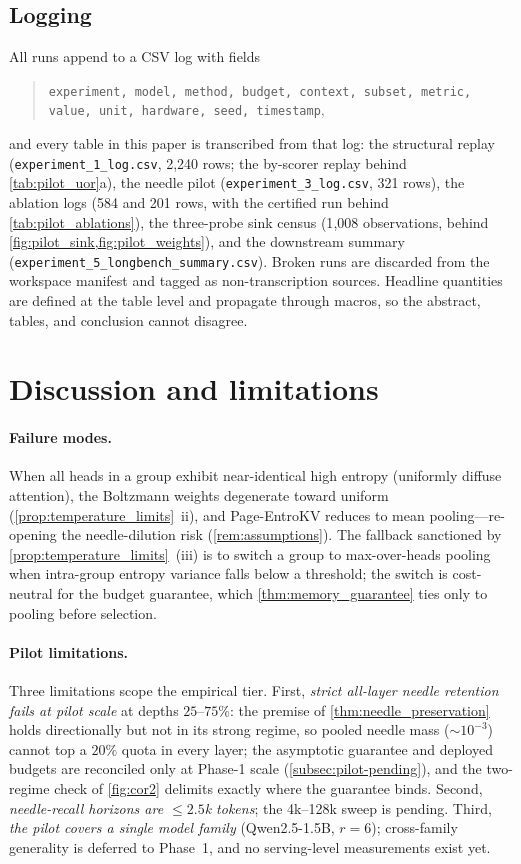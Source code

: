 \documentclass[final,5p,times,twocolumn]{elsarticle}
\theoremstyle{definition}
\theoremstyle{remark}
\newcommand{\method}{Page-EntroKV}
\begin{document}
\subsection{Logging}
\label{subsec:pilot-logging}

All runs append to a CSV log with fields
\begin{quote}\small
\texttt{experiment, model, method, budget, context, subset, metric,
value, unit, hardware, seed, timestamp},
\end{quote}
and every table in this paper is transcribed from that log: the
structural replay (\texttt{experiment\_1\_log.csv}, 2{,}240 rows; the
by-scorer replay behind \cref{tab:pilot_uor}a), the needle pilot
(\texttt{experiment\_3\_log.csv}, 321 rows), the ablation logs (584 and
201 rows, with the certified run behind \cref{tab:pilot_ablations}),
the three-probe sink census (1{,}008 observations, behind
\cref{fig:pilot_sink,fig:pilot_weights}), and the downstream summary
(\texttt{experiment\_5\_longbench\_summary.csv}). Broken runs are
discarded from the workspace manifest and tagged as non-transcription
sources. Headline quantities are defined at the table level and
propagate through macros, so the abstract, tables, and conclusion
cannot disagree.

\section{Discussion and limitations}
\label{sec:discussion}

\paragraph{Failure modes.}
When all heads in a group exhibit near-identical high entropy (uniformly
diffuse attention), the Boltzmann weights degenerate toward uniform
(\cref{prop:temperature_limits}~ii), and \method{} reduces to mean
pooling---re-opening the needle-dilution risk
(\cref{rem:assumptions}). The fallback sanctioned by
\cref{prop:temperature_limits}~(iii) is to switch a group to
max-over-heads pooling when intra-group entropy variance falls below a
threshold; the switch is cost-neutral for the budget guarantee, which
\cref{thm:memory_guarantee} ties only to pooling before selection.

\paragraph{Pilot limitations.}
Three limitations scope the empirical tier. First, \emph{strict
all-layer needle retention fails at pilot scale} at depths
 $25$--$75\%$: the premise of \cref{thm:needle_preservation} holds
directionally but not in its strong regime, so pooled needle mass
($\sim 10^{-3}$) cannot top a $20\%$ quota in every layer; the
asymptotic guarantee and deployed budgets are reconciled only at
Phase-1 scale (\cref{subsec:pilot-pending}), and the two-regime check
of \cref{fig:cor2} delimits exactly where the guarantee binds. Second,
\emph{needle-recall horizons are $\le 2.5$k tokens}; the 4k--128k sweep
is pending. Third, \emph{the pilot covers a single model family}
(Qwen2.5-1.5B, $r{=}6$); cross-family generality is deferred to
Phase~1, and no serving-level measurements exist yet.
\end{document}
